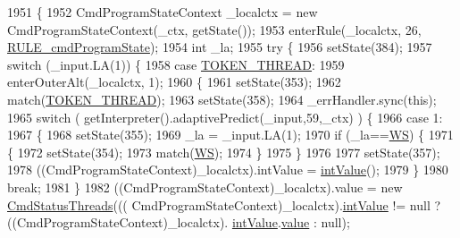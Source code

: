\begin{DoxyCode}
1951                                                                                     \{
1952     CmdProgramStateContext \_localctx = \textcolor{keyword}{new} CmdProgramStateContext(\_ctx, getState());
1953     enterRule(\_localctx, 26, \hyperlink{classgov_1_1nasa_1_1jpf_1_1inspector_1_1client_1_1parser_1_1_console_grammar_parser_a1c1e3ab45ed4919c0562ba9b62c9c846}{RULE\_cmdProgramState});
1954     \textcolor{keywordtype}{int} \_la;
1955     \textcolor{keywordflow}{try} \{
1956       setState(384);
1957       \textcolor{keywordflow}{switch} (\_input.LA(1)) \{
1958       \textcolor{keywordflow}{case} \hyperlink{classgov_1_1nasa_1_1jpf_1_1inspector_1_1client_1_1parser_1_1_console_grammar_parser_a98c6d3f678390b5821c0c1b2092d3662}{TOKEN\_THREAD}:
1959         enterOuterAlt(\_localctx, 1);
1960         \{
1961         setState(353);
1962         match(\hyperlink{classgov_1_1nasa_1_1jpf_1_1inspector_1_1client_1_1parser_1_1_console_grammar_parser_a98c6d3f678390b5821c0c1b2092d3662}{TOKEN\_THREAD});
1963         setState(358);
1964         \_errHandler.sync(\textcolor{keyword}{this});
1965         \textcolor{keywordflow}{switch} ( getInterpreter().adaptivePredict(\_input,59,\_ctx) ) \{
1966         \textcolor{keywordflow}{case} 1:
1967           \{
1968           setState(355);
1969           \_la = \_input.LA(1);
1970           \textcolor{keywordflow}{if} (\_la==\hyperlink{classgov_1_1nasa_1_1jpf_1_1inspector_1_1client_1_1parser_1_1_console_grammar_parser_a6914a3a3adbc350b12a7df9d1b24abf1}{WS}) \{
1971             \{
1972             setState(354);
1973             match(\hyperlink{classgov_1_1nasa_1_1jpf_1_1inspector_1_1client_1_1parser_1_1_console_grammar_parser_a6914a3a3adbc350b12a7df9d1b24abf1}{WS});
1974             \}
1975           \}
1976 
1977           setState(357);
1978           ((CmdProgramStateContext)\_localctx).intValue = \hyperlink{classgov_1_1nasa_1_1jpf_1_1inspector_1_1client_1_1parser_1_1_console_grammar_parser_a132b5d5236398d90d8d1e6b16dc0bd20}{intValue}();
1979           \}
1980           \textcolor{keywordflow}{break};
1981         \}
1982          ((CmdProgramStateContext)\_localctx).value =  \textcolor{keyword}{new} \hyperlink{classgov_1_1nasa_1_1jpf_1_1inspector_1_1client_1_1commands_1_1_cmd_status_threads}{CmdStatusThreads}(((
      CmdProgramStateContext)\_localctx).\hyperlink{classgov_1_1nasa_1_1jpf_1_1inspector_1_1client_1_1parser_1_1_console_grammar_parser_a132b5d5236398d90d8d1e6b16dc0bd20}{intValue} != null ? ((CmdProgramStateContext)\_localctx).
      \hyperlink{classgov_1_1nasa_1_1jpf_1_1inspector_1_1client_1_1parser_1_1_console_grammar_parser_a132b5d5236398d90d8d1e6b16dc0bd20}{intValue}.\hyperlink{classgov_1_1nasa_1_1jpf_1_1inspector_1_1client_1_1parser_1_1_console_grammar_parser_1_1_int_value_context_a47964dd9f967981f0b77c57b35833709}{value} : null); 

\end{DoxyCode}
